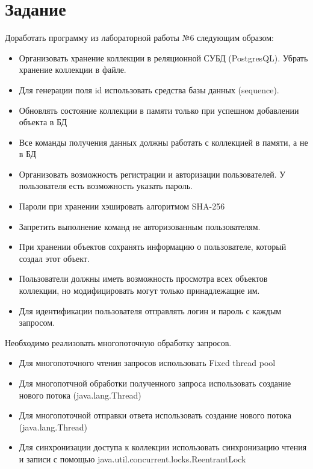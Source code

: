 \documentclass{article}
\begin{document}
\itmo[
  variant=74273.77,
  labn=7,
  discipline=Программирование,
  group=P3115,
  student=Владимир Мацюк,
  teacher=Кустарев Иван Павлович,
  year=2023,
  logo=../../../lib/img/itmo.png
]

\section*{Задание}

Доработать программу из лабораторной работы №6 следующим образом:

\begin{itemize}
  \item Организовать хранение коллекции в реляционной СУБД (PostgresQL). Убрать хранение коллекции в файле.
  \item Для генерации поля id использовать средства базы данных (sequence).
  \item Обновлять состояние коллекции в памяти только при успешном добавлении объекта в БД
  \item Все команды получения данных должны работать с коллекцией в памяти, а не в БД
  \item Организовать возможность регистрации и авторизации пользователей. У пользователя есть возможность указать пароль.
  \item Пароли при хранении хэшировать алгоритмом SHA-256
  \item Запретить выполнение команд не авторизованным пользователям.
  \item При хранении объектов сохранять информацию о пользователе, который создал этот объект.
  \item Пользователи должны иметь возможность просмотра всех объектов коллекции, но модифицировать могут только принадлежащие им.
  \item Для идентификации пользователя отправлять логин и пароль с каждым запросом.
\end{itemize}

Необходимо реализовать многопоточную обработку запросов.

\begin{itemize}
  \item Для многопоточного чтения запросов использовать Fixed thread pool
  \item Для многопотчной обработки полученного запроса использовать создание нового потока (java.lang.Thread)
  \item Для многопоточной отправки ответа использовать создание нового потока (java.lang.Thread)
  \item Для синхронизации доступа к коллекции использовать синхронизацию чтения и записи с помощью java.util.concurrent.locks.ReentrantLock
\end{itemize}
\end{document}
